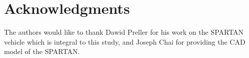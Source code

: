\documentclass[journal]{new-aiaa}
\begin{document}
 


\section*{Acknowledgments}

The authors would like to thank Dawid Preller for his work on the SPARTAN vehicle which is integral to this study, and Joseph Chai for providing the CAD model of the SPARTAN.

\footnotesize

%

\end{document}

